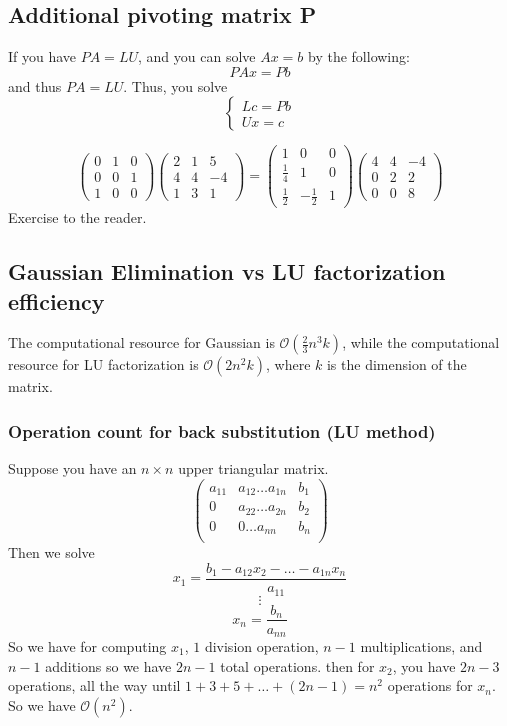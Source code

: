 \documentclass[11pt]{article}
\begin{document}
\subsection{Additional pivoting matrix P}
If you have $PA = LU$, and you can solve $Ax = b$ by the following:
\[
    PAx = Pb
\]
and thus $PA = LU$. Thus, you solve
\[
\begin{cases}
    Lc = Pb\\
    Ux = c
\end{cases}
\]

\begin{example}
    \[
    \begin{pmatrix}
        0 & 1 & 0 \\
        0 & 0 & 1 \\
        1 & 0 & 0
    \end{pmatrix}
    \begin{pmatrix}
        2 & 1& 5\\
        4 & 4 & -4 \\
        1 & 3 & 1
    \end{pmatrix}
    =
    \begin{pmatrix}
        1 & 0 & 0\\
        \frac{1}{4} & 1 & 0\\
        \frac{1}{2} & -\frac{1}{2} & 1
    \end{pmatrix}
    \begin{pmatrix}
        4 & 4 & -4 \\
        0 & 2 & 2 \\
        0 & 0 & 8
    \end{pmatrix}
    \]
    Exercise to the reader.
\end{example}

\subsection{Gaussian Elimination vs LU factorization efficiency}
The computational resource for Gaussian is $\mathcal{O}(\frac{2}{3}n^3k)$, while the computational resource for LU factorization is $\mathcal{O}(2n^2k)$, where 
$k$ is the dimension of the matrix.


\subsubsection{Operation count for back substitution (LU method)}
Suppose you have an $n \times n$ upper triangular matrix.
\[
    \begin{pmatrix}
        a_{11} & a_{12} \dots a_{1n} & b_1 \\
        0 & a_{22} \dots a_{2n} & b_2 \\
        0 & 0 \dots a_{nn} & b_n \\
    \end{pmatrix}
\]
Then we solve
\[
    x_1 = \frac{b_1 - a_{12}x_2 - \dots - a_{1n} x_n}{a_{11}}
\]
\[
    \vdots
\]
\[
    x_n = \frac{b_n}{a_{nn}}
\]
So we have for computing $x_1$, $1$ division operation, $n-1$ multiplications, and $n-1$ additions so we have $2n-1$ total operations.
then for $x_2$, you have $2n-3$ operations, all the way until $1+3+5+\dots+(2n-1) = n^2$ operations for $x_n$.
So we have $\mathcal{O}(n^2)$.
\end{document}

